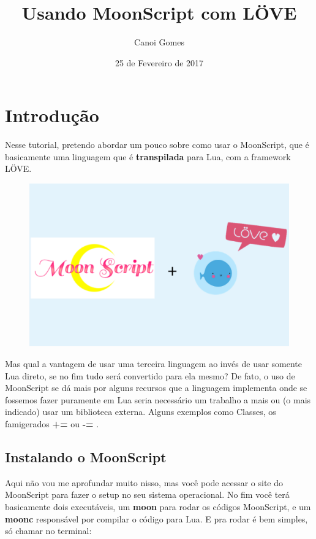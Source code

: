 \documentclass[a4paper,oneside,12pt]{article}
\title{Usando MoonScript com LÖVE}
\author{Canoi Gomes}
\date{25 de Fevereiro de 2017}
\newcommand{\mybox}[1]{
    \colorbox{backcolour}{\textbf{#1}}
}
\begin{document}
\maketitle
\newpage

\tableofcontents
\newpage

\section{Introdução}

Nesse tutorial, pretendo abordar um pouco sobre como usar o MoonScript, que é basicamente uma linguagem que é \textbf{transpilada} para Lua, com a framework LÖVE.

\begin{figure}[h]
    \centering
    \includegraphics[width=\linewidth]{media/moonscript_with_love.png}
\end{figure}

Mas qual a vantagem de usar uma terceira linguagem ao invés de usar somente Lua direto, se no fim tudo será convertido para ela mesmo? De fato, o uso de MoonScript se dá mais por alguns recursos que a linguagem implementa onde se fossemos fazer puramente em Lua seria necessário um trabalho a mais ou (o mais indicado) usar um biblioteca externa. Alguns exemplos como Classes, os famigerados \mybox{+=} ou \mybox{-=}.

\subsection{Instalando o MoonScript}

Aqui não vou me aprofundar muito nisso, mas você pode acessar o site do MoonScript para fazer o setup no seu sistema operacional. No fim você terá basicamente dois executáveis, um \textbf{moon} para rodar os códigos MoonScript, e um \textbf{moonc} responsável por compilar o código para Lua. E pra rodar é bem simples, só chamar no terminal:
\end{document}
